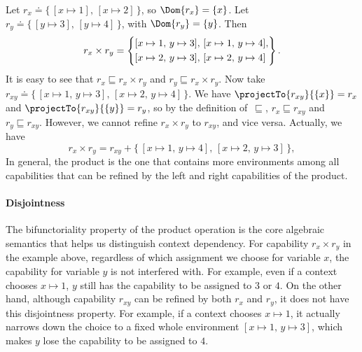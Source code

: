 \begin{example}[Bifunctoriality]\label{ex-bifunctoriality}
Let $r_x \doteq \{\,[x \mapsto 1],\, [x \mapsto 2]\,\}$, so
$\Dom{r_x} = \{x\}$.
Let $r_y \doteq \{\,[y \mapsto 3],\, [y \mapsto 4]\,\}$, with $\Dom{r_y} = \{y\}$.
Then
\[
  r_x \times r_y
  = \left\{
    \begin{array}{@{}l@{}}
      [x \mapsto 1,\, y \mapsto 3],\,
      [x \mapsto 1,\, y \mapsto 4],\\[\jot]
      [x \mapsto 2,\, y \mapsto 3],\,
      [x \mapsto 2,\, y \mapsto 4]
    \end{array}
  \right\}.
\]
It is easy to see that $r_x \sqsubseteq r_x \times r_y$ and $r_y \sqsubseteq r_x \times r_y$.
Now take
$r_{xy} \doteq \{\, [x \mapsto 1,\, y \mapsto 3],\, [x \mapsto 2,\, y \mapsto 4]\,\}$.
We have
$\projectTo{r_{xy}}{\{x\}} = r_x$ and $\projectTo{r_{xy}}{\{y\}} = r_y$,
so by the definition of~$\sqsubseteq$,
$r_x \sqsubseteq r_{xy}$ and $r_y \sqsubseteq r_{xy}$. However, we cannot refine $r_x \times r_y$ to $r_{xy}$, and vice versa. Actually, we have
\[
  r_x \times r_y
  = r_{xy} + \{\, [x \mapsto 1,\, y \mapsto 4],\, [x \mapsto 2,\, y \mapsto 3] \,\},
\]
In general, the product is the one that contains more environments among all capabilities that can be refined by the left and right capabilities of the product.
\end{example}

\paragraph{Disjointness} The bifunctoriality property of the product operation is the core algebraic semantics that helps us distinguish context dependency. For capability $r_x \times r_y$ in the example above, regardless of which assignment we choose for variable $x$, the capability for variable $y$ is not interfered with. For example, even if a context chooses $x \mapsto 1$, $y$ still has the capability to be assigned to $3$ or $4$.
On the other hand, although capability $r_{xy}$ can be refined by both $r_x$ and $r_y$, it does not have this disjointness property. For example, if a context chooses $x \mapsto 1$, it actually narrows down the choice to a fixed whole environment $[x \mapsto 1,\, y \mapsto 3]$, which makes $y$ lose the capability to be assigned to $4$.

